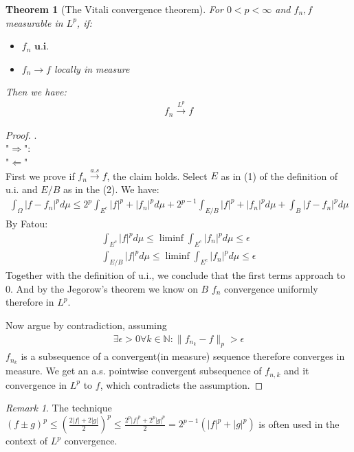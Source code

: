 \documentclass[a4paper,11pt,oneside,fleqn]{book}
\newtheorem{theorem}{Theorem}[section]
\theoremstyle{definition}
\theoremstyle{remark}
\newtheorem*{remark}{Remark}
\begin{document}
\begin{theorem}[The Vitali convergence theorem]
	For $0< p < \infty$ and $f_n, f$ measurable in $L^p$, if:
	\begin{itemize}
		\item $f_n \textbf{  u.i.}$
		\item $f_n \longrightarrow f$ locally in measure
	\end{itemize}
	Then we have:
	\begin{align*}
		f_n \overset{L^p}{\longrightarrow} f 
	\end{align*}
\end{theorem}
\begin{proof}.\\
	"$\Rightarrow$":\\
	"$\Leftarrow$"\\
	First we prove if $f_n \overset{a.s}{\longrightarrow} f$, the claim holds. 
	Select $E$ as in (1) of the definition of u.i. and $E \slash B$ as in the (2). We have:
	\begin{align*}
		\int_\Omega |f - f_n|^p d\mu \leq 2^p \int_{E^c} |f|^p + |f_n|^p d\mu 
		+ 2^{p-1} \int_{E \slash B} |f|^p + |f_n|^p d\mu + \int_B |f - f_n|^p d\mu 
	\end{align*}
	By Fatou:
	\begin{align*}
		\int_{E^c} |f|^p d\mu \leq \liminf \int_{E^c} |f_n|^p d\mu \leq \epsilon\\
		\int_{E\slash B} |f|^p d\mu  \leq \liminf \int_{E^c} |f_n|^p d\mu  \leq \epsilon
	\end{align*}
	Together with the definition of u.i., we conclude that the first terms approach to 0. And by the Jegorow's theorem we know on $B$ $f_n$ convergence uniformly therefore in $L^p$.\par 
	Now argue by contradiction, assuming 
	\begin{align*}
		\exists \epsilon >0 \forall k \in \mathbb{N} : \|f_{n_k} - f\|_p > \epsilon
	\end{align*}
	$f_{n_k}$ is a subsequence of a convergent(in measure) sequence therefore converges in measure. We get an a.s. pointwise convergent subsequence of $f_{n,k}$ and it convergence in $L^p$ to $f$, which contradicts the assumption.
\end{proof}
\begin{remark}
The technique $(f \pm g)^p \leq (\frac{2|f| + 2|g|}{2})^p \leq \frac{2^p |f|^p + 2^p|g|^p}{2} = 2^{p-1}(|f|^p + |g|^p)$ is often used in the context of $L^p$ convergence.	
\end{remark}
\newpage
\end{document}

